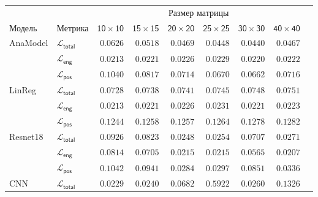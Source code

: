 \documentclass[a4paper,12pt]{extarticle}
\begin{document}
\begin{table}[t]
	\footnotesize
	\centering
	\begin{tabular}{llrrrrrrr}
		\toprule
		{} & {} & \multicolumn{6}{c}{\textsf{Размер матрицы}} \\
		\cmidrule(lr){3-8}
		\textsf{Модель} & \textsf{Метрика} & $\mathsf{10 \times 10}$ &  $\mathsf{15 \times 15}$ &  $\mathsf{20 \times 20}$ &  $\mathsf{25 \times 25}$ &  $\mathsf{30 \times 30}$ &  $\mathsf{40 \times 40}$ \\
		\midrule
        \textsf{AnaModel} & $\mathcal{L}_{\mathsf{total}}$ & $\mathsf{0.0626}$ & $\mathsf{0.0518}$ & $\mathsf{0.0469}$ & $\mathsf{0.0448}$ & $\mathsf{0.0440}$ & $\mathsf{0.0467}$ \\
        {} & $\mathcal{L}_{\mathsf{eng}}$ & $\mathsf{0.0213}$ & $\mathsf{0.0221}$ & $\mathsf{0.0226}$ & $\mathsf{0.0229}$ & $\mathsf{0.0220}$ & $\mathsf{0.0222}$ \\
        {} & $\mathcal{L}_{\mathsf{pos}}$ & $\mathsf{0.1040}$ & $\mathsf{0.0817}$ & $\mathsf{0.0714}$ & $\mathsf{0.0670}$ & $\mathsf{0.0662}$ & $\mathsf{0.0716}$ \\
        \midrule
        \textsf{LinReg} & $\mathcal{L}_{\mathsf{total}}$ & $\mathsf{0.0728}$ & $\mathsf{0.0738}$ & $\mathsf{0.0741}$ & $\mathsf{0.0745}$ & $\mathsf{0.0748}$ & $\mathsf{0.0751}$ \\
        {} & $\mathcal{L}_{\mathsf{eng}}$ & $\mathsf{0.0213}$ & $\mathsf{0.0221}$ & $\mathsf{0.0226}$ & $\mathsf{0.0231}$ & $\mathsf{0.0221}$ & $\mathsf{0.0223}$ \\
        {} & $\mathcal{L}_{\mathsf{pos}}$ & $\mathsf{0.1244}$ & $\mathsf{0.1258}$ & $\mathsf{0.1257}$ & $\mathsf{0.1264}$ & $\mathsf{0.1278}$ & $\mathsf{0.1282}$ \\
        \midrule
        \textsf{Resnet18} & $\mathcal{L}_{\mathsf{total}}$ & $\mathsf{0.0926}$ & $\mathsf{0.0823}$ & $\mathsf{0.0248}$ & $\mathsf{0.0254}$ & $\mathsf{0.0707}$ & $\mathsf{0.0271}$ \\
        {} & $\mathcal{L}_{\mathsf{eng}}$ & $\mathsf{0.0814}$ & $\mathsf{0.0705}$ & $\mathsf{0.0215}$ & $\mathsf{0.0215}$ & $\mathsf{0.0565}$ & $\mathsf{0.0207}$ \\
        {} & $\mathcal{L}_{\mathsf{pos}}$ & $\mathsf{0.1042}$ & $\mathsf{0.0941}$ & $\mathsf{0.0284}$ & $\mathsf{0.0297}$ & $\mathsf{0.0851}$ & $\mathsf{0.0336}$ \\
        \midrule
        \textsf{CNN} & $\mathcal{L}_{\mathsf{total}}$ & $\mathsf{0.0229}$ & $\mathsf{0.0240}$ & $\mathsf{0.0682}$ & $\mathsf{0.5922}$ & $\mathsf{0.0260}$ & $\mathsf{0.1326}$ \\

\end{tabular}
\end{table}
\end{document}
